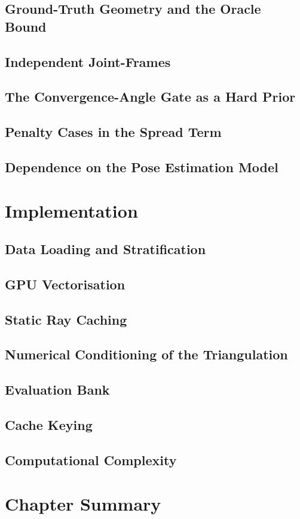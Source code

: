 \subsection{Ground-Truth Geometry and the Oracle Bound}

\subsection{Independent Joint-Frames}

\subsection{The Convergence-Angle Gate as a Hard Prior}

\subsection{Penalty Cases in the Spread Term}

\subsection{Dependence on the Pose Estimation Model}

\section{Implementation}
\label{sec:fepsoimplementation}

\subsection{Data Loading and Stratification}

\subsection{GPU Vectorisation}

\subsection{Static Ray Caching}

\subsection{Numerical Conditioning of the Triangulation}

\subsection{Evaluation Bank}

\subsection{Cache Keying}

\subsection{Computational Complexity}

\section{Chapter Summary}
\label{sec:optimisationsummary}
